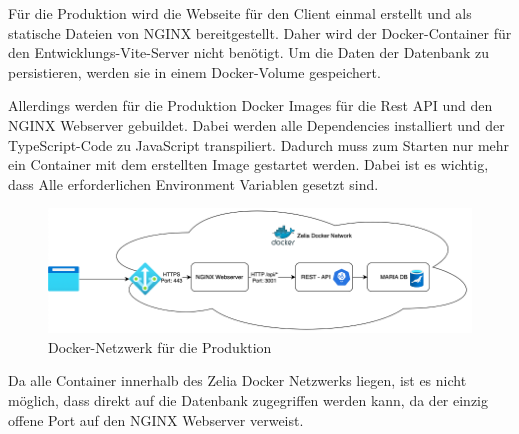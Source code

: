 
Für die Produktion wird die Webseite für den Client einmal erstellt und als statische Dateien von NGINX bereitgestellt. Daher wird der Docker-Container für den Entwicklungs-Vite-Server nicht benötigt. Um die Daten der Datenbank zu persistieren, werden sie in einem Docker-Volume gespeichert. 

Allerdings werden für die Produktion Docker Images für die Rest API und den NGINX Webserver gebuildet. Dabei werden alle Dependencies installiert und der TypeScript-Code zu JavaScript transpiliert. Dadurch muss zum Starten nur mehr ein Container mit dem erstellten Image gestartet werden. Dabei ist es wichtig, dass Alle erforderlichen Environment Variablen gesetzt sind.

\begin{figure}[H]
    \centering
    \includegraphics{media/Docker/ProdNetwork.png}
    \caption{Docker-Netzwerk für die Produktion}
\end{figure}

Da alle Container innerhalb des Zelia Docker Netzwerks liegen, ist es nicht möglich, dass direkt auf die Datenbank zugegriffen werden kann, da der einzig offene Port auf den NGINX Webserver verweist. 